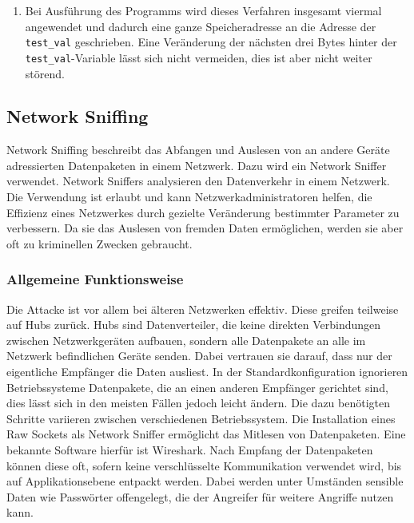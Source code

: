 \documentclass[11pt, a4paper]{article}
\begin{document}
\begin{enumerate}
	\paragraph{Wrapping Around}
	Ein Byte entspricht einem Zeichen bestehend aus acht \gls{bit}. Die Binärzahl \texttt{11111111} entspricht der Dezimalzahl \(255\). Bei Erhöhung um eins bekommt die Binärzahl ein neuntes Zeichen und sieht wie folgt aus: \texttt{100000000}. In diesem Fall sind nur die letzten acht \glspl{bit} von Bedeutung. Diese bleiben bei einer Erhöhung der Zahl um die Dezimalzahl \(256\) gleich. Dadurch lässt sich das Problem der bereits zu hohen Anzahl gedruckter Zeichen eifach lösen, indem statt der ursprünglichen Zahl die nächsthöhere Zahl in Schritten von 256 verwendet wird. 
	
	\item Bei Ausführung des Programms wird dieses Verfahren insgesamt viermal angewendet und dadurch eine ganze Speicheradresse an die Adresse der \texttt{test\_val} geschrieben. Eine Veränderung der nächsten drei Bytes hinter der \texttt{test\_val}-Variable lässt sich nicht vermeiden, dies ist aber nicht weiter störend. 
\end{enumerate}

\subsection{Network Sniffing}\label{subsec:networksniffing}
Network Sniffing beschreibt das Abfangen und Auslesen von an andere Geräte adressierten Datenpaketen in einem Netzwerk. Dazu wird ein Network Sniffer verwendet. Network Sniffers analysieren den Datenverkehr in einem Netzwerk. Die Verwendung ist erlaubt und kann Netzwerkadministratoren helfen, die Effizienz eines Netzwerkes durch gezielte Veränderung bestimmter Parameter zu verbessern. Da sie das Auslesen von fremden Daten ermöglichen, werden sie aber oft zu kriminellen Zwecken gebraucht.
\subsubsection{Allgemeine Funktionsweise}
Die Attacke ist vor allem bei älteren Netzwerken effektiv. Diese greifen teilweise auf Hubs zurück. Hubs sind Datenverteiler, die keine direkten Verbindungen zwischen Netzwerkgeräten aufbauen, sondern alle Datenpakete an alle im Netzwerk befindlichen Geräte senden. Dabei vertrauen sie darauf, dass nur der eigentliche Empfänger die Daten ausliest. In der Standardkonfiguration ignorieren Betriebssysteme Datenpakete, die an einen anderen Empfänger gerichtet sind, dies lässt sich in den meisten Fällen jedoch leicht ändern. Die dazu benötigten Schritte variieren zwischen verschiedenen Betriebssystem. Die Installation eines Raw Sockets als Network Sniffer ermöglicht das Mitlesen von Datenpaketen. Eine bekannte Software hierfür ist Wireshark. Nach Empfang der Datenpaketen können diese oft, sofern keine verschlüsselte Kommunikation verwendet wird, bis auf Applikationsebene entpackt werden. Dabei werden unter Umständen sensible Daten wie Passwörter offengelegt, die der Angreifer für weitere Angriffe nutzen kann. 
\end{document}
